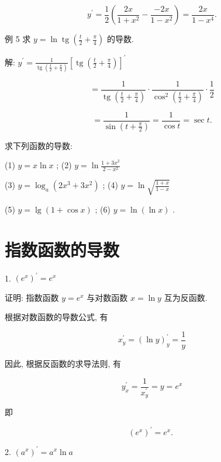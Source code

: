 \documentclass[lang=cn,newtx,10pt,scheme=chinese]{elegantbook}
\begin{document}
\[
{y}^{\prime } = \frac{1}{2}\left( {\frac{2x}{1 + {x}^{2}} - \frac{-{2x}}{1 - {x}^{2}}}\right) = \frac{2x}{1 - {x}^{4}}.
\]

例 5 求 \(y = \ln \operatorname{tg}\left( {\frac{t}{2} + \frac{\pi }{4}}\right)\) 的导数.

解: \({y}^{\prime } = \frac{1}{\operatorname{tg}\left( {\frac{t}{2} + \frac{\pi }{4}}\right) }{\left\lbrack \operatorname{tg}\left( \frac{t}{2} + \frac{\pi }{4}\right) \right\rbrack }^{\prime }\)

\[
= \frac{1}{\operatorname{tg}\left( {\frac{t}{2} + \frac{\pi }{4}}\right) } \cdot \frac{1}{{\cos }^{2}\left( {\frac{t}{2} + \frac{\pi }{4}}\right) } \cdot \frac{1}{2}
\]

\[
= \frac{1}{\sin \left( {t + \frac{\pi }{2}}\right) } = \frac{1}{\cos t} = \sec t.
\]

\begin{problemset}[练习]

\item 求下列函数的导数:

(1) \(y = x\ln x\) ; (2) \(y = \ln \frac{1 + 3{x}^{2}}{2 - {x}^{2}}\)

(3) \(y = {\log }_{a}\left( {2{x}^{3} + 3{x}^{2}}\right)\) ; (4) \(y = \ln \sqrt{\frac{1 + x}{1 - x}}\)

(5) \(y = \lg \left( {1 + \cos x}\right)\) ; (6) \(y = \ln \left( {\ln x}\right)\) .

\end{problemset}

\section{指数函数的导数}

1. \({\left( {e}^{x}\right) }^{\prime } = {e}^{x}\)

证明: 指数函数 \(y = {e}^{x}\) 与对数函数 \(x = \ln y\) 互为反函数.

根据对数函数的导数公式, 有

\[
{x}_{y}^{\prime } = {\left( \ln y\right) }_{y}^{\prime } = \frac{1}{y}
\]

因此, 根据反函数的求导法则, 有

\[
{y}_{x}^{\prime } = \frac{1}{{x}_{y}^{\prime }} = y = {e}^{x}
\]

即

\[
{\left( {e}^{x}\right) }^{\prime } = {e}^{x}\text{. }
\]

2. \({\left( {a}^{x}\right) }^{\prime } = {a}^{x}\ln a\)
\end{document}
